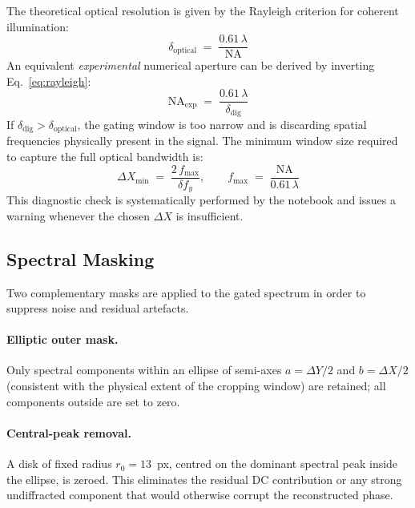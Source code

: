 The theoretical optical resolution is given by the Rayleigh criterion for
coherent illumination:
\begin{equation}
    \delta_\text{optical} \;=\; \frac{0.61\,\lambda}{\mathrm{NA}}
    \label{eq:rayleigh}
\end{equation}
An equivalent \textit{experimental} numerical aperture can be derived by
inverting Eq.~\eqref{eq:rayleigh}:
\begin{equation}
    \mathrm{NA}_\text{exp} \;=\; \frac{0.61\,\lambda}{\delta_\text{dig}}
\end{equation}
If $\delta_\text{dig} > \delta_\text{optical}$, the gating window is too
narrow and is discarding spatial frequencies physically present in the signal.
The minimum window size required to capture the full optical bandwidth is:
\begin{equation}
    \Delta X_\text{min} \;=\; \frac{2\,f_\text{max}}{\delta f_y}, \qquad
    f_\text{max} \;=\; \frac{\mathrm{NA}}{0.61\,\lambda}
\end{equation}
This diagnostic check is systematically performed by the notebook and
issues a warning whenever the chosen $\Delta X$ is insufficient.

\subsection{Spectral Masking}

Two complementary masks are applied to the gated spectrum in order to
suppress noise and residual artefacts.

\paragraph{Elliptic outer mask.}
Only spectral components within an ellipse of semi-axes
$a = \Delta Y/2$ and $b = \Delta X/2$ (consistent with the physical extent of
the cropping window) are retained; all components outside are set to zero.

\paragraph{Central-peak removal.}
A disk of fixed radius $r_0 = 13$~px, centred on the dominant spectral peak
inside the ellipse, is zeroed.
This eliminates the residual DC contribution or any strong undiffracted
component that would otherwise corrupt the reconstructed phase.

